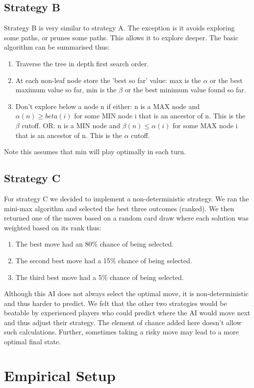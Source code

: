 \documentclass[12pt]{article}
\begin{document}
\subsection{Strategy B}
Strategy B is very similar to strategy A. The exception is it avoids exploring some paths, or prunes some paths. This allows it to explore deeper. The basic algorithm can be summarised thus:

\begin{enumerate}
\item Traverse the tree in depth first search order.
\item At each non-leaf node store the 'best so far' value: max is the $\alpha$ or the best maximum value so far, min is the $\beta$ or the best minimum value found so far.
\item Don't explore below a node n if either: n is a MAX node and $\alpha(n) \geq beta(i)$ for some MIN node i that is an ancestor of n. This is the $\beta$ cutoff. OR: n is a MIN node and $\beta(n) \leq \alpha(i)$ for some MAX node i that is an ancestor of n. This is the $\alpha$ cutoff.
\end{enumerate}
Note this assumes that min will play optimally in each turn.

\subsection{Strategy C}
For strategy C we decided to implement a non-deterministic strategy. We ran the mini-max algorithm and selected the best three outcomes (ranked). We then returned one of the moves based on a random card draw where each solution was weighted based on its rank thus:
\begin{enumerate}
\item The best move had an 80\% chance of being selected.
\item The second best move had a 15\% chance of being selected.
\item The third best move had a 5\% chance of being selected.
\end{enumerate}
Although this AI does not always select the optimal move, it is non-deterministic and thus harder to predict. We felt that the other two strategies would be beatable by experienced players who could predict where the AI would move next and thus adjust their strategy. The element of chance added here doesn't allow such calculations. Further, sometimes taking a risky move may lead to a more optimal final state.

\section{Empirical Setup}
\end{document}
